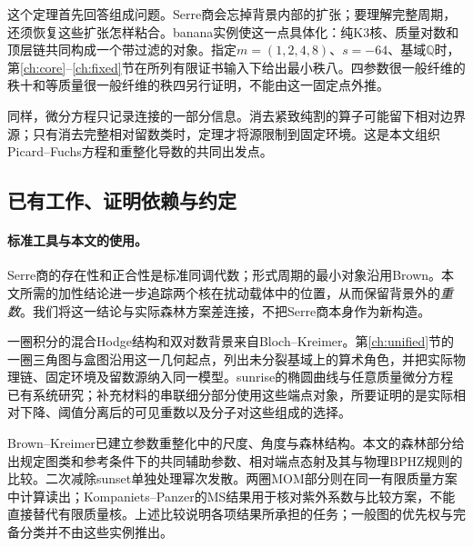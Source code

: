 \documentclass[11pt,a4paper,oneside]{ctexart}
\theoremstyle{cnplain}
\theoremstyle{definition}
\theoremstyle{remark}
\numberwithin{equation}{section}
\begin{document}
这个定理首先回答组成问题。Serre商会忘掉背景内部的扩张；要理解完整周期，还须恢复这些扩张怎样粘合。banana实例使这一点具体化：纯K3核、质量对数和顶层链共同构成一个带过滤的对象。指定$m=(1,2,4,8)$、$s=-64$、基域$\mathbb Q$时，第\ref{ch:core}--\ref{ch:fixed}节在所列有限证书输入下给出最小秩八。四参数很一般纤维的秩十和等质量很一般纤维的秩四另行证明，不能由这一固定点外推。

同样，微分方程只记录连接的一部分信息。消去紧致纯割的算子可能留下相对边界源；只有消去完整相对留数类时，定理才将源限制到固定环境。这是本文组织Picard--Fuchs方程和重整化导数的共同出发点。

\subsection{已有工作、证明依赖与约定}
\paragraph{标准工具与本文的使用。}
Serre商的存在性和正合性是标准同调代数\cite{stacks}；形式周期的最小对象沿用Brown\cite{brownperiods}。本文所需的加性结论进一步追踪两个核在扰动载体中的位置，从而保留背景外的\emph{重数}。我们将这一结论与实际森林方案差连接，不把Serre商本身作为新构造。

一圈积分的混合Hodge结构和双对数背景来自Bloch--Kreimer\cite{bkone}。第\ref{ch:unified}节的一圈三角图与盒图沿用这一几何起点，列出未分裂基域上的算术角色，并把实际物理链、固定环境及留数源纳入同一模型。sunrise的椭圆曲线与任意质量微分方程已有系统研究\cite{abwsun,bkvsunset}；补充材料的串联细分部分使用这些端点对象，所要证明的是实际相对下降、阈值分离后的可见重数以及分子对这些组成的选择。

Brown--Kreimer已建立参数重整化中的尺度、角度与森林结构\cite{bk2011,bk2012}。本文的森林部分给出规定图类和参考条件下的共同辅助参数、相对端点态射及其与物理BPHZ规则的比较。二次减除sunset单独处理幂次发散。两圈MOM部分则在同一有限质量方案中计算读出；Kompaniets--Panzer的MS结果用于核对紫外系数与比较方案，不能直接替代有限质量核\cite{kp}。上述比较说明各项结果所承担的任务；一般图的优先权与完备分类并不由这些实例推出。
\end{document}
